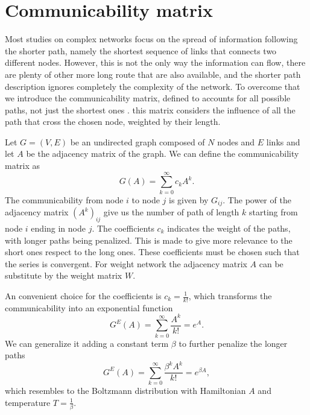\section{Communicability matrix}

Most studies on complex networks focus on the spread of information following the shorter path, namely the shortest sequence of links that connects two different nodes. 
However, this is not the only way the information can flow, there are plenty of other more long route that are also available, and the shorter path description ignores completely the complexity of the network.
To overcome that we introduce the communicability matrix, defined to accounts for all possible paths, not just the shortest ones \cite{Estrada_2012}. this matrix considers the influence of all the path that cross the chosen node, weighted by their length.

Let $G=(V,E)$ be an undirected graph composed of $N$ nodes and $E$ links and let $A$ be the adjacency matrix of the graph.
We can define the communicability matrix as
\begin{equation}
    G(A) = \sum_{k=0}^{\infty}c_k A^k.
\end{equation}
The communicability from node $i$ to node $j$ is given by $G_{ij}$. The power of the adjacency matrix $(A^k)_{ij}$ give us the number of path of length $k$ starting from node $i$ ending in node $j$.
The coefficients $c_k$ indicates the weight of the paths, with longer paths being penalized. This is made to give more relevance to the short ones respect to the long ones. These coefficients must be chosen such that the series is convergent.
For weight network the adjacency matrix $A$ can be substitute by the weight matrix $W$.

An convenient choice for the coefficients is $c_k = \frac{1}{k!}$, which transforms the communicability into an exponential function \cite{Estrada_2008}
\begin{equation}\label{G_E}
    G^E(A) =\sum_{k=0}^{\infty} \frac{A^k}{k!} = e^{A} .
\end{equation}
We can generalize it adding a constant term $\beta$ to further penalize the longer paths
\begin{equation}
    G^E(A) =\sum_{k=0}^{\infty} \frac{\beta^k A^k}{k!} = e^{\beta A} ,
\end{equation}
which resembles to the Boltzmann distribution with Hamiltonian $A$ and temperature $T = \frac{1}{\beta}$.


